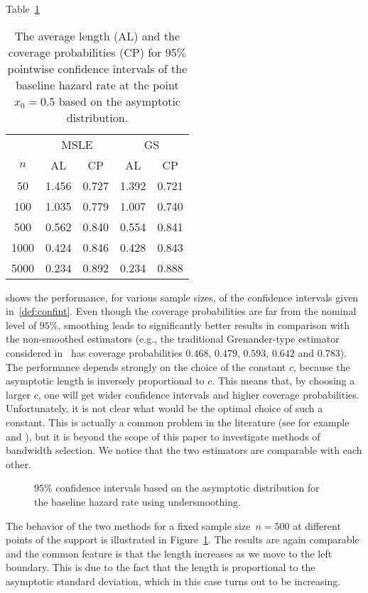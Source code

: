 \documentclass[11pt,reqno]{amsart}
\theoremstyle{definition}
\theoremstyle{plain}
\theoremstyle{remark}
\begin{document}
Table~\ref{tab:1}
\begin{table}[h]
\begin{tabular}{ccccc}
\toprule
      &    \multicolumn{2}{c}{MSLE}&   \multicolumn{2}{c}{GS}  \\
$n$     & AL    & CP & AL    & CP    \\
50    &  1.456 & 0.727 & 1.392 & 0.721 \\
100   &  1.035 & 0.779 & 1.007 & 0.740  \\
500   &  0.562 & 0.840 & 0.554 & 0.841 \\
1000  &  0.424 & 0.846 & 0.428 & 0.843 \\
5000  &  0.234 & 0.892  & 0.234 & 0.888 \\
\bottomrule
\end{tabular}
\caption{The average length (AL) and the coverage probabilities (CP) for $95\%$ pointwise confidence intervals of the baseline hazard rate at the point $x_0=0.5$ based on the asymptotic distribution. }
\label{tab:1}
\end{table}
shows the performance, for various sample sizes, of the confidence intervals given in~\eqref{def:confint}.
Even though the coverage probabilities are far from the nominal level of $95\%$, smoothing leads to significantly better results in comparison with the non-smoothed estimators
(e.g., the traditional Grenander-type estimator considered in~\cite{LopuhaaNane2013} has coverage probabilities $0.468$, $0.479$, $0.593$, $0.642$ and $0.783$).
The performance depends strongly on the choice of the constant $c$, because the asymptotic length is inversely proportional to $c$.
This means that, by choosing a larger $c$, one will get wider confidence intervals and higher coverage probabilities.
Unfortunately, it is not clear what would be the optimal choice of such a constant.
This is actually a common problem in the literature (see for example~\cite{CHT06} and \cite{GCM96}),
but it is beyond the scope of this paper to investigate methods of bandwidth selection.
We notice that the two estimators are comparable with each other.
\begin{figure}[t]
\centering
{} \quad
{}
\caption{$95\%$ confidence intervals based on the asymptotic distribution for the baseline hazard rate using undersmoothing.}
\label{fig:subfig4}
\end{figure}
The behavior of the two methods for a fixed sample size~$n=500$ at different points of the support is illustrated in Figure~\ref{fig:subfig4}.
The results are again comparable and the common feature is that the length increases as we move to the left boundary.
This is due to the fact that the length is proportional to the asymptotic standard deviation, which in this case turns out to be increasing.

\printbibliography
\end{document}
